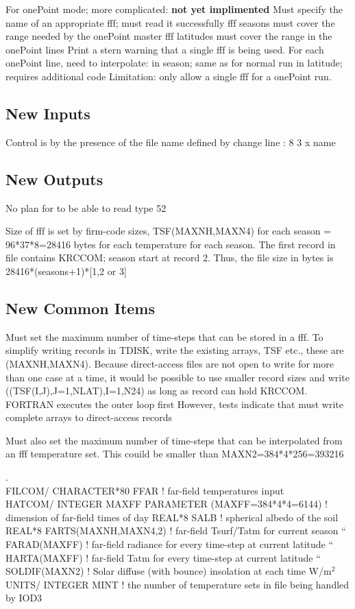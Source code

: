 For onePoint mode; more complicated: \textbf{not yet implimented}
\qi Must specify the name of an appropriate fff; must read it successfully
\qii fff seasons must cover the range needed by the onePoint master
\qii fff latitudes must cover the range in the onePoint lines
\qi Print a stern warning that a single  fff is being used.
\qi For each onePoint line, need to interpolate: 
\qii in season; same as for normal run
\qii in latitude; requires additional code
\qi Limitation: only allow a single fff for a onePoint run.

\subsection{New Inputs} %
Control is by the presence of the file name defined by change line : 8 3 x name
\qi  
\subsection{New Outputs} %
 No plan for  to be able to read type 52

Size of fff is set by firm-code sizes, TSF(MAXNH,MAXN4) for each season =
96*37*8=28416 bytes for each temperature for each season. The first record in
file contains KRCCOM; season start at record 2. Thus, the file size in bytes is
28416*(seasons+1)*[1,2 or 3]
 
\subsection{New Common Items} %

Must set the maximum number of time-steps that can be stored in a fff. To simplify writing records in TDISK,  write the existing arrays, TSF etc., these are (MAXNH,MAXN4). Because direct-access files are not open to write for more than one case at a time, it would be possible to use smaller record sizes and write 
\qi ((TSF(I,J),J=1,NLAT),I=1,N24) as long as record can hold KRCCOM.
\qii FORTRAN executes the outer loop first
\qi However, tests indicate that must write complete arrays to direct-access records

Must also set the maximum number of time-steps that can be interpolated from an fff temperature set.  This couild be smaller than MAXN2=384*4*256=393216
\qi


.
\\ FILCOM/  CHARACTER*80 FFAR     ! far-field temperatures input
\\ HATCOM/        INTEGER MAXFF
      PARAMETER (MAXFF=384*4*4=6144) ! dimension of far-field times of day
REAL*8  SALB                 ! spherical albedo of the soil
\qi REAL*8 FARTS(MAXNH,MAXN4,2) ! far-field Tsurf/Tatm for current season
\qi ``    FARAD(MAXFF) ! far-field radiance for every time-step at current latitude
\qi  ``  HARTA(MAXFF) ! far-field Tatm for every time-step at current latitude
\qi  ``  SOLDIF(MAXN2) ! Solar diffuse (with bounce) insolation at each time W/m$^2$
\\ UNITS/ INTEGER  MINT ! the number of temperature sets in file being handled by IOD3 

